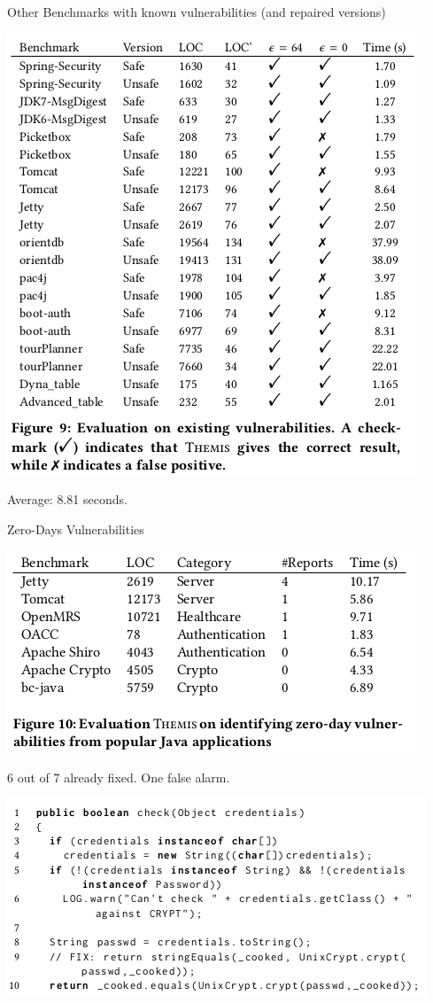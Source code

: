 \documentclass[page number]{beamer}
\begin{document}
\begin{frame}{Other Benchmarks with known vulnerabilities (and repaired versions)}
 \begin{center}
    \includegraphics[scale=0.36]{img_chen/9.png}
  \end{center}
 Average: 8.81 seconds.
\end{frame}

\begin{frame}{Zero-Days Vulnerabilities}
  \begin{center}
    \includegraphics[scale=0.4]{img_chen/10.png}
  \end{center}
  6 out of 7 already fixed. One false alarm.
  \begin{center}
    \includegraphics[scale=0.4]{img_chen/11.png}
  \end{center}
\end{frame}
\end{document}
